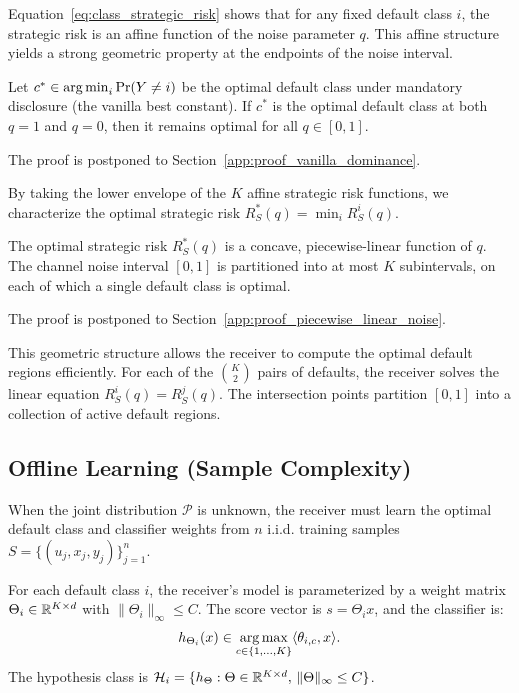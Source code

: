 Equation~\eqref{eq:class_strategic_risk} shows that for any fixed default class $i$, the strategic risk is an affine function of the noise parameter $q$. This affine structure yields a strong geometric property at the endpoints of the noise interval.
\begin{theorem}
\label{thm:vanilla_dominance}
Let $c^* \in \operatorname*{arg\,min}_i \Pr(Y \ne i)$ be the optimal default class under mandatory disclosure (the vanilla best constant). If $c^*$ is the optimal default class at both $q = 1$ and $q = 0$, then it remains optimal for all $q \in [0, 1]$.
\end{theorem}
The proof is postponed to Section~\ref{app:proof_vanilla_dominance}.

By taking the lower envelope of the $K$ affine strategic risk functions, we characterize the optimal strategic risk $R^*_S(q) = \min_i R^i_S(q)$.
\begin{theorem}
\label{thm:piecewise_linear_noise}
The optimal strategic risk $R^*_S(q)$ is a concave, piecewise-linear function of $q$. The channel noise interval $[0, 1]$ is partitioned into at most $K$ subintervals, on each of which a single default class is optimal.
\end{theorem}
The proof is postponed to Section~\ref{app:proof_piecewise_linear_noise}.

\begin{remark}
This geometric structure allows the receiver to compute the optimal default regions efficiently. For each of the $\binom{K}{2}$ pairs of defaults, the receiver solves the linear equation $R^i_S(q) = R^j_S(q)$. The intersection points partition $[0, 1]$ into a collection of active default regions.
\end{remark}

\subsection{Offline Learning (Sample Complexity)}
\label{sec:classification_offline}
When the joint distribution $\mathcal{P}$ is unknown, the receiver must learn the optimal default class and classifier weights from $n$ i.i.d. training samples $S = \{(u_j, x_j, y_j)\}_{j=1}^n$. 

For each default class $i$, the receiver's model is parameterized by a weight matrix $\Theta_i \in \mathbb{R}^{K \times d}$ with $\|\Theta_i\|_\infty \le C$. The score vector is $s = \Theta_i x$, and the classifier is:
\begin{equation}
    \label{eq:multiclass_classifier_form}
    h_{\Theta_i}(x) \in \operatorname*{arg\,max}_{c \in \{1, \dots, K\}} \langle \theta_{i,c}, x \rangle.
\end{equation}
The hypothesis class is $\mathcal{H}_i = \{h_{\Theta} : \Theta \in \mathbb{R}^{K \times d}, \, \|\Theta\|_\infty \le C\}$. 

